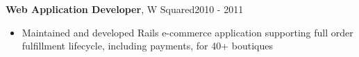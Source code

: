 {\bf Web Application Developer}, W Squared\hfill 2010 - 2011
\begin{itemize} \itemsep -2pt
\item Maintained and developed Rails e-commerce application supporting full order fulfillment lifecycle, including payments, for 40+ boutiques
\end{itemize}





